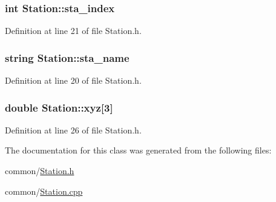 \hypertarget{classStation_a1d576c7627ce27b72d78cbfe26c29d60}{
\subsubsection[{sta\_\-index}]{\setlength{\rightskip}{0pt plus 5cm}int {\bf Station::sta\_\-index}}}
\label{classStation_a1d576c7627ce27b72d78cbfe26c29d60}


Definition at line 21 of file Station.h.

\hypertarget{classStation_ad06effdce23c36b4281297e636f852c2}{
\subsubsection[{sta\_\-name}]{\setlength{\rightskip}{0pt plus 5cm}string {\bf Station::sta\_\-name}}}
\label{classStation_ad06effdce23c36b4281297e636f852c2}


Definition at line 20 of file Station.h.

\hypertarget{classStation_af5b031756ab9e16e3f35bfd9ca0f0d70}{
\subsubsection[{xyz}]{\setlength{\rightskip}{0pt plus 5cm}double {\bf Station::xyz}\mbox{[}3\mbox{]}}}
\label{classStation_af5b031756ab9e16e3f35bfd9ca0f0d70}


Definition at line 26 of file Station.h.



The documentation for this class was generated from the following files:\begin{DoxyCompactItemize}
\item 
common/\hyperlink{Station_8h}{Station.h}\item 
common/\hyperlink{Station_8cpp}{Station.cpp}\end{DoxyCompactItemize}
